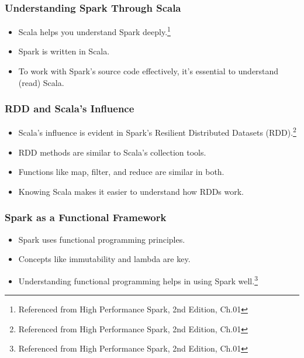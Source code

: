 \begin{frame}
    \frametitle{Understanding Spark Through Scala}
    \begin{itemize}
        \item Scala helps you understand Spark deeply.\footnote{Referenced from High Performance Spark, 2nd Edition, Ch.01}
        \item Spark is written in Scala.
        \item To work with Spark's source code effectively, it's essential to understand (read) Scala.
    \end{itemize}

\end{frame}

\begin{frame}
    \frametitle{RDD and Scala's Influence}
    \begin{itemize}
        \item Scala's influence is evident in Spark's Resilient Distributed Datasets (RDD).\footnote{Referenced from High Performance Spark, 2nd Edition, Ch.01}
        \item RDD methods are similar to Scala's collection tools.
        \item Functions like map, filter, and reduce are similar in both.
        \item Knowing Scala makes it easier to understand how RDDs work.
    \end{itemize}

\end{frame}

\begin{frame}
    \frametitle{Spark as a Functional Framework}
    \begin{itemize}
        \item Spark uses functional programming principles.
        \item Concepts like immutability and lambda are key.
        \item Understanding functional programming helps in using Spark well.\footnote{Referenced from High Performance Spark, 2nd Edition, Ch.01}
    \end{itemize}

\end{frame}




